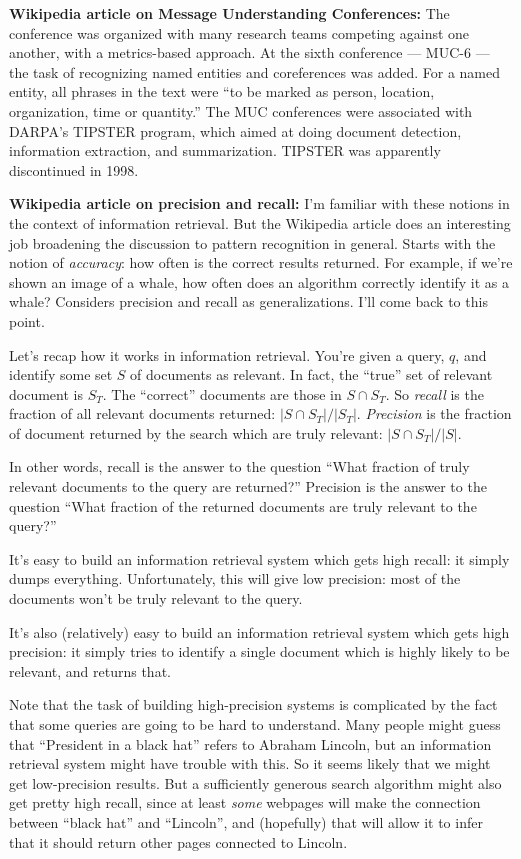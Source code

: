 \textbf{Wikipedia article on Message Understanding Conferences:} The
conference was organized with many research teams competing against
one another, with a metrics-based approach.  At the sixth conference
--- MUC-6 --- the task of recognizing named entities and coreferences
was added.  For a named entity, all phrases in the text were ``to be
marked as person, location, organization, time or quantity.''  The MUC
conferences were associated with DARPA's TIPSTER program, which aimed
at doing document detection, information extraction, and
summarization.  TIPSTER was apparently discontinued in 1998.

\textbf{Wikipedia article on precision and recall:} I'm familiar with
these notions in the context of information retrieval.  But the
Wikipedia article does an interesting job broadening the discussion to
pattern recognition in general.  Starts with the notion of
\emph{accuracy}: how often is the correct results returned.  For
example, if we're shown an image of a whale, how often does an
algorithm correctly identify it as a whale?  Considers precision and
recall as generalizations.  I'll come back to this point.

Let's recap how it works in information retrieval.  You're given a
query, $q$, and identify some set $S$ of documents as relevant.  In
fact, the ``true'' set of relevant document is $S_T$.  The ``correct''
documents are those in $S \cap S_T$.  So \emph{recall} is the fraction
of all relevant documents returned: $|S \cap S_T| / |S_T|$.
\emph{Precision} is the fraction of document returned by the search
which are truly relevant: $|S \cap S_T| / |S|$.

In other words, recall is the answer to the question ``What fraction
of truly relevant documents to the query are returned?''  Precision is
the answer to the question ``What fraction of the returned documents
are truly relevant to the query?''

It's easy to build an information retrieval system which gets high
recall: it simply dumps everything.  Unfortunately, this will give
low precision: most of the documents won't be truly relevant to the
query.

It's also (relatively) easy to build an information retrieval system
which gets high precision: it simply tries to identify a single
document which is highly likely to be relevant, and returns that.  

Note that the task of building high-precision systems is complicated
by the fact that some queries are going to be hard to understand.
Many people might guess that ``President in a black hat'' refers to
Abraham Lincoln, but an information retrieval system might have
trouble with this.  So it seems likely that we might get low-precision
results.  But a sufficiently generous search algorithm might also get
pretty high recall, since at least \emph{some} webpages will make the
connection between ``black hat'' and ``Lincoln'', and (hopefully) that
will allow it to infer that it should return other pages connected to
Lincoln.

